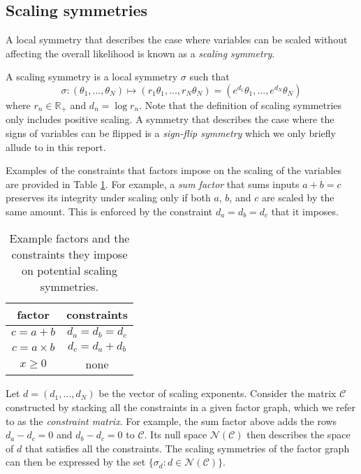 \subsection{Scaling symmetries} \label{sec:scaling}

A local symmetry that describes the case where variables can be scaled without affecting the overall likelihood is known as a \textit{scaling symmetry}.
\begin{defn}
A scaling symmetry is a local symmetry $\sigma$ such that
\[
\sigma: (\theta_1,...,\theta_N) \longmapsto (r_1\theta_1,...,r_N\theta_N) = (e^{d_1}\theta_1,...,e^{d_N}\theta_N)
\]
where $r_n\in\mathbb{R}_+$ and $d_n=\log r_n$. Note that the definition of scaling symmetries only includes positive scaling. A symmetry that describes the case where the signs of variables can be flipped is a \textit{sign-flip symmetry} which we only briefly allude to in this report.
\end{defn}
Examples of the constraints that factors impose on the scaling of the variables are provided in Table \ref{tab:scaling}. For example, a \textit{sum factor} that sums inputs $a+b=c$ preserves its integrity under scaling only if both $a$, $b$, and $c$ are scaled by the same amount. This is enforced by the constraint $d_a=d_b=d_c$ that it imposes.

\begin{table}[b]
\centering
\begin{tabular}{|c|c|}
\hline
factor & constraints \\
\hline
$c=a+b$ & $d_a = d_b = d_c$ \\
$c = a\times b$ & $d_c= d_a + d_b$ \\
$x\geq0$ & none \\
\hline
\end{tabular}
\caption{Example factors and the constraints they impose on potential scaling symmetries.}
\label{tab:scaling}
\end{table}

Let $d=(d_1,...,d_N)$ be the vector of scaling exponents. Consider the matrix $\mathcal{C}$ constructed by stacking all the constraints in a given factor graph, which we refer to as the \textit{constraint matrix}. For example, the sum factor above adds the rows $d_a-d_c=0$ and $d_b-d_c=0$ to $\mathcal{C}$. Its null space $\mathcal{N}(\mathcal{C})$ then describes the space of $d$ that satisfies all the constraints. The scaling symmetries of the factor graph can then be expressed by the set $\{\sigma_d:d\in\mathcal{N}(\mathcal{C})\}$.


